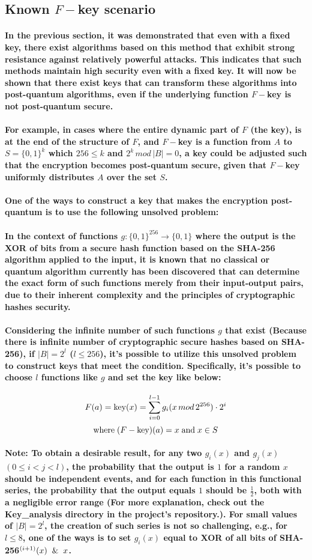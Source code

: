\documentclass[oneside]{book}
\newcommand{\myparagraph}[1]{\paragraph{\textnormal{#1}}}
\begin{document}
\newpage

\subsection{Known $F-$key scenario}

\myparagraph{
In the previous section, it was demonstrated that even with a fixed key, there exist algorithms based on this method that exhibit strong resistance against relatively powerful attacks. This indicates that such methods maintain high security even with a fixed key. It will now be shown that there exist keys that can transform these algorithms into post-quantum algorithms, even if the underlying function $F-$key is not post-quantum secure.
}

\myparagraph{
For example, in cases where the entire dynamic part of $F$ (the key), is at the end of the structure of $F$, and $F-$key is a function from $A$ to $S = \{0, 1\}^k$ which $256 \le k$ and $2^k \, mod \, |B| = 0$, a key could be adjusted such that the encryption becomes post-quantum secure, given that $F-$key uniformly distributes $A$ over the set $S$.
}

\myparagraph{
\textbf{One of the ways to construct a key that makes the encryption post-quantum is to use the following unsolved problem:}
}

\myparagraph{
In the context of functions $g: \{0, 1\}^{256} \rightarrow \{0, 1\}$ where the output is the XOR of bits from a secure hash function based on the SHA-256 algorithm applied to the input, it is known that no classical or quantum algorithm currently has been discovered that can determine the exact form of such functions merely from their input-output pairs, due to their inherent complexity and the principles of cryptographic hashes security.
}

\myparagraph{
Considering the infinite number of such functions $g$ that exist (Because there is infinite number of cryptographic secure hashes based on SHA-256), if $|B| = 2 ^ l$ ($l \le 256$), it's possible to utilize this unsolved problem to construct keys that meet the condition. Specifically, it's possible to choose $l$ functions like $g$ and set the key like below:
}

$$F(a) = \textnormal{key}(x) = \sum_{i=0}^{l-1} g_i(x\, mod \, 2^{256}) \cdot 2 ^ i $$
$$ \text{where} \; (F - \text{key})(a) = x \; \textnormal{and} \; x \in S$$

\myparagraph{
\textbf{Note:} To obtain a desirable result, for any two $g_i(x)$ and $g_j(x)$ $(0 \le i  < j < l)$, the probability that the output is $1$ for a random $x$ should be independent events, and for each function in this functional series, the probability that the output equals $1$ should be $\frac{1}{2}$, both with a negligible error range (For more explanation, check out the \textbf{Key\_analysis} directory in the project's repository.). For small values of $|B| = 2^l$, the creation of such series is not so challenging, e.g., for $l \le 8$, one of the ways is to set $g_i(x)$ equal to XOR of all bits of SHA-256$^{(i+1)}(x) \And x$.
}
\end{document}
